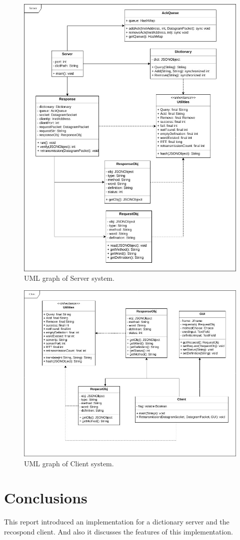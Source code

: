 \documentclass[11pt]{article}
\begin{document}
\begin{figure}
	\centering
	\includegraphics[width=\textwidth]{DS_Server}
	\caption{UML graph of Server system.}
	\label{fig:serverUML}
\end{figure}	

\begin{figure}
	\centering
	\includegraphics[width=\textwidth]{DS_Client}
	\caption{UML graph of Client system.}
	\label{fig:clientUML}
\end{figure}

\section{Conclusions}
This report introduced an implementation for a dictionary server and the recospond client. And also it discusses the features of this implementation.
\end{document}
